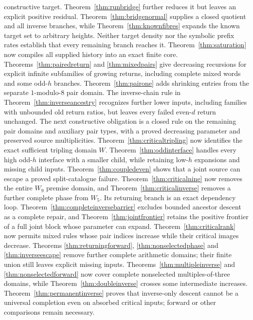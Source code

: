 \documentclass[11pt]{article}
\begin{document}
constructive target. Theorem~\ref{thm:runbridge} further reduces it but
leaves an explicit positive residual. Theorem~\ref{thm:bridgenormal}
supplies a closed quotient and all inverse branches, while
Theorem~\ref{thm:knownfibres} expands the known target set to arbitrary
heights. Neither target density nor the symbolic prefix rates establish
that every remaining branch reaches it.
Theorem~\ref{thm:saturation} now compiles all supplied history into an
exact finite core. Theorems~\ref{thm:pairedreturn} and
\ref{thm:mixedpairs} give decreasing recursions for explicit infinite
subfamilies of growing returns, including complete mixed words and some
odd-$h$ branches. Theorem~\ref{thm:pairone} adds shrinking entries
from the separate $1$-modulo-$8$ pair domain. The inverse-chain rule in
Theorem~\ref{thm:inverseancestry} recognizes further lower inputs,
including families with unbounded old return ratios, but leaves every
failed even-$d$ return unchanged. The next constructive obligation is
a closed rule on the remaining pair domains and auxiliary pair types,
with a proved decreasing parameter and preserved source multiplicities.
Theorem~\ref{thm:criticaltripling} now identifies the exact sufficient
tripling domain $W$. Theorem~\ref{thm:oddinterface} handles every high
odd-$h$ interface with a smaller child, while retaining low-$h$ expansions
and missing child inputs. Theorem~\ref{thm:coupledeven} shows that a
joint source can escape a proved split-catalogue failure.
Theorem~\ref{thm:criticalnine} now removes the entire $W_9$ premise
domain, and Theorem~\ref{thm:criticalinverse} removes a further complete
phase from $W_5$. Its returning branch is an exact dependency loop.
Theorem~\ref{thm:completeinversebarrier} excludes bounded ancestor descent
as a complete repair, and Theorem~\ref{thm:jointfrontier} retains the
positive frontier of a full joint block whose parameter can expand.
Theorem~\ref{thm:criticalrank} now permits mixed rules whose pair indices
increase while their critical images decrease. Theorems
\ref{thm:returningforward}, \ref{thm:nonselectedphase} and
\ref{thm:inverseescape} remove further complete arithmetic domains;
their finite union still leaves explicit missing inputs.
Theorems~\ref{thm:multipleinverse} and \ref{thm:nonselectedforward}
now cover complete nonselected multiples-of-three domains, while
Theorem~\ref{thm:doubleinverse} crosses some intermediate increases.
Theorem~\ref{thm:permanentinverse} proves that inverse-only descent
cannot be a universal completion even on absorbed critical inputs;
forward or other comparisons remain necessary.
\end{document}
